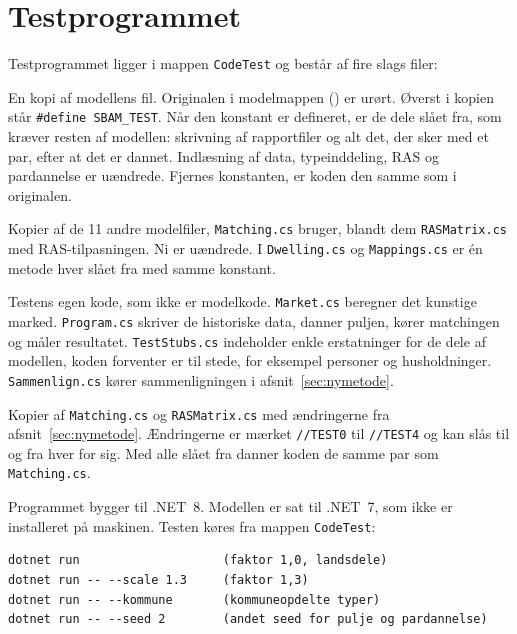 \documentclass[11pt,a4paper]{article}
\newcommand{\kode}[1]{\texttt{#1}}
\begin{document}
\section{Testprogrammet}

Testprogrammet ligger i mappen \kode{CodeTest} og består af fire slags filer:

\begin{description}[leftmargin=1.5em, style=nextline]
\item[\kode{Matching.cs}] En kopi af modellens fil. Originalen i modelmappen
() er urørt. Øverst i kopien står \kode{\#define SBAM\_TEST}. Når den
konstant er defineret, er de dele slået fra, som kræver resten af modellen: skrivning af
rapportfiler og alt det, der sker med et par, efter at det er dannet. Indlæsning af data,
typeinddeling, RAS og pardannelse er uændrede. Fjernes konstanten, er koden den samme som i
originalen.

\item[\kode{SmileFiles\textbackslash}] Kopier af de 11 andre modelfiler, \kode{Matching.cs} bruger,
blandt dem \kode{RASMatrix.cs} med RAS-tilpasningen. Ni er uændrede. I \kode{Dwelling.cs} og
\kode{Mappings.cs} er én metode hver slået fra med samme konstant.

\item[\kode{Test\textbackslash}] Testens egen kode, som ikke er modelkode. \kode{Market.cs} beregner
det kunstige marked. \kode{Program.cs} skriver de historiske data, danner puljen, kører matchingen
og måler resultatet. \kode{TestStubs.cs} indeholder enkle erstatninger for de dele af modellen,
koden forventer er til stede, for eksempel personer og husholdninger. \kode{Sammenlign.cs} kører
sammenligningen i afsnit~\ref{sec:nymetode}.

\item[\kode{Matching\_test.cs} og \kode{RASMatrix\_test.cs}] Kopier af \kode{Matching.cs} og
\kode{RASMatrix.cs} med ændringerne fra afsnit~\ref{sec:nymetode}. Ændringerne er mærket
\kode{//TEST0} til \kode{//TEST4} og kan slås til og fra hver for sig. Med alle slået fra danner
koden de samme par som \kode{Matching.cs}.
\end{description}

Programmet bygger til .NET~8. Modellen er sat til .NET~7, som ikke er installeret på maskinen. Testen
køres fra mappen \kode{CodeTest}:

{\small
\begin{verbatim}
dotnet run                    (faktor 1,0, landsdele)
dotnet run -- --scale 1.3     (faktor 1,3)
dotnet run -- --kommune       (kommuneopdelte typer)
dotnet run -- --seed 2        (andet seed for pulje og pardannelse)
\end{verbatim}
}
\end{document}

